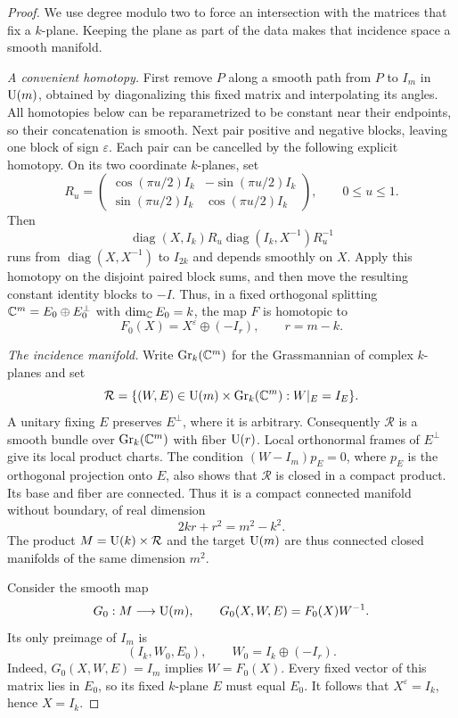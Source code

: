 \begin{proof}
We use degree modulo two to force an intersection with the matrices
that fix a $k$-plane.  Keeping the plane as part of the data makes that
incidence space a smooth manifold.

\medskip\noindent
\emph{A convenient homotopy.}
First remove $P$ along a smooth path from $P$ to $I_m$ in $\operatorname{U}(m)$,
obtained by diagonalizing this fixed matrix and interpolating its angles.
All homotopies below can be reparametrized to be constant near their
endpoints, so their concatenation is smooth.
Next pair positive and negative blocks, leaving one block of sign
$\varepsilon$.  Each pair can be cancelled by the following explicit
homotopy.  On its two coordinate $k$-planes, set
\[
 R_u=\begin{pmatrix}
 \cos(\pi u/2)I_k&-\sin(\pi u/2)I_k\\
 \sin(\pi u/2)I_k&\cos(\pi u/2)I_k
 \end{pmatrix},\qquad 0\leq u\leq1.
\]
Then
\[
 \operatorname{diag}(X,I_k)R_u
 \operatorname{diag}(I_k,X^{-1})R_u^{-1}
\]
runs from $\operatorname{diag}(X,X^{-1})$ to $I_{2k}$ and depends
smoothly on $X$.  Apply this homotopy on the disjoint paired block
sums, and then move the resulting constant identity blocks to $-I$.
Thus, in a fixed orthogonal splitting
$\mathbb C^m=E_0\oplus E_0^\perp$ with $\dim_{\mathbb C}E_0=k$, the map $F$ is
homotopic to
\[
 F_0(X)=X^\varepsilon\oplus(-I_r),\qquad r=m-k.
\]

\medskip\noindent
\emph{The incidence manifold.}
Write $\operatorname{Gr}_k(\mathbb C^m)$ for the Grassmannian of complex $k$-planes and set
\[
 \mathcal R=\{(W,E)\in\operatorname{U}(m)\times\operatorname{Gr}_k(\mathbb C^m):
                 W|_E=I_E\}.
\]
A unitary fixing $E$ preserves $E^\perp$, where it is arbitrary.
Consequently $\mathcal R$ is a smooth bundle over $\operatorname{Gr}_k(\mathbb C^m)$
with fiber $\operatorname{U}(r)$.  Local orthonormal frames of $E^\perp$ give its
local product charts.  The condition $(W-I_m)p_E=0$, where $p_E$ is
the orthogonal projection onto $E$, also shows that $\mathcal R$ is
closed in a compact product.  Its base and fiber are connected.
Thus it is a compact connected manifold without boundary, of real dimension
\[
 2kr+r^2=m^2-k^2.
\]
The product $M=\operatorname{U}(k)\times\mathcal R$ and the target $\operatorname{U}(m)$ are
thus connected closed manifolds of the same dimension $m^2$.

Consider the smooth map
\[
 G_0:M\longrightarrow\operatorname{U}(m),\qquad
 G_0(X,W,E)=F_0(X)W^{-1}.
\]
Its only preimage of $I_m$ is
\[
 (I_k,W_0,E_0),\qquad W_0=I_k\oplus(-I_r).
\]
Indeed, $G_0(X,W,E)=I_m$ implies $W=F_0(X)$.  Every fixed vector
of this matrix lies in $E_0$, so its fixed $k$-plane $E$ must equal
$E_0$.  It follows that $X^\varepsilon=I_k$, hence $X=I_k$.


\end{proof}
